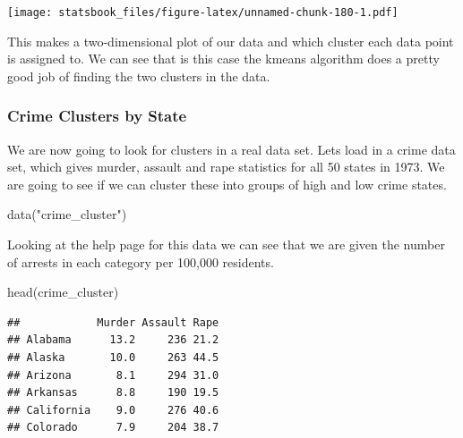 \documentclass[
]{book}
\newenvironment{Shaded}{\begin{snugshade}}{\end{snugshade}}
\newcommand{\AttributeTok}[1]{\textcolor[rgb]{0.77,0.63,0.00}{#1}}
\newcommand{\DecValTok}[1]{\textcolor[rgb]{0.00,0.00,0.81}{#1}}
\newcommand{\FunctionTok}[1]{\textcolor[rgb]{0.00,0.00,0.00}{#1}}
\newcommand{\NormalTok}[1]{#1}
\newcommand{\OtherTok}[1]{\textcolor[rgb]{0.56,0.35,0.01}{#1}}
\newcommand{\SpecialCharTok}[1]{\textcolor[rgb]{0.00,0.00,0.00}{#1}}
\newcommand{\StringTok}[1]{\textcolor[rgb]{0.31,0.60,0.02}{#1}}
\theoremstyle{definition}
\theoremstyle{definition}
\theoremstyle{definition}
\theoremstyle{definition}
\theoremstyle{remark}
\begin{document}
\begin{Shaded}
\end{Shaded}

\texttt{[image: statsbook\_files/figure-latex/unnamed-chunk-180-1.pdf]}

This makes a two-dimensional plot of our data and which cluster each data point is assigned to. We can see that is this case the kmeans algorithm does a pretty good job of finding the two clusters in the data.

\hypertarget{crime-clusters-by-state}{%
\subsubsection{Crime Clusters by State}\label{crime-clusters-by-state}}

We are now going to look for clusters in a real data set. Lets load in a crime data set, which gives murder, assault and rape statistics for all 50 states in 1973. We are going to see if we can cluster these into groups of high and low crime states.

\begin{Shaded}
\begin{Highlighting}[]
\FunctionTok{data}\NormalTok{(}\StringTok{"crime\_cluster"}\NormalTok{)}
\end{Highlighting}
\end{Shaded}

Looking at the help page for this data we can see that we are given the number of arrests in each category per 100,000 residents.

\begin{Shaded}
\begin{Highlighting}[]
\FunctionTok{head}\NormalTok{(crime\_cluster)}
\end{Highlighting}
\end{Shaded}

\begin{verbatim}
##            Murder Assault Rape
## Alabama      13.2     236 21.2
## Alaska       10.0     263 44.5
## Arizona       8.1     294 31.0
## Arkansas      8.8     190 19.5
## California    9.0     276 40.6
## Colorado      7.9     204 38.7
\end{verbatim}
\end{document}
